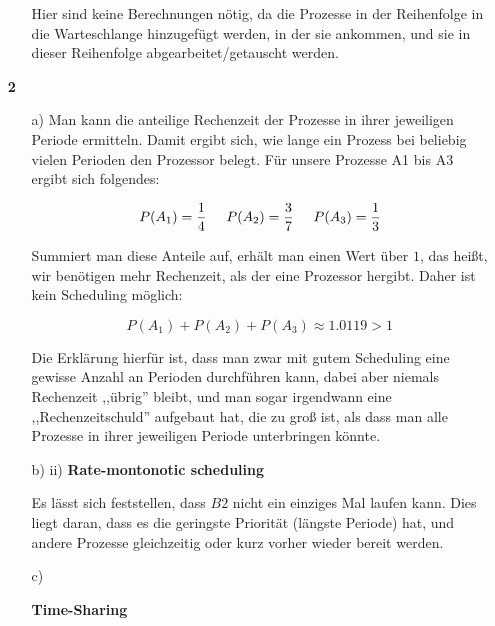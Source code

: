 \documentclass[a4paper,11pt]{article}
\begin{document}
\begin{enumerate}
\begin{itemize}
    Hier sind keine Berechnungen nötig, da die Prozesse in der Reihenfolge
    in die Warteschlange hinzugefügt werden, in der sie ankommen, und sie in
    dieser Reihenfolge abgearbeitet/getauscht werden.
\end{itemize}

\item[\textbf{2}]

\begin{itemize}
    \item[a)]
        Man kann die anteilige Rechenzeit der Prozesse in ihrer jeweiligen Periode
        ermitteln. Damit ergibt sich, wie lange ein Prozess bei beliebig vielen
        Perioden den Prozessor belegt. Für unsere Prozesse A1 bis A3 ergibt sich
        folgendes:

        $$P(A_1) = \frac{1}{4} \hspace{0.5cm} P(A_2) = \frac{3}{7} \hspace{0.5cm} P(A_3) = \frac{1}{3}$$

        Summiert man diese Anteile auf, erhält man einen Wert über $1$, das heißt,
        wir benötigen mehr Rechenzeit, als der eine Prozessor hergibt. Daher ist
        kein Scheduling möglich:

        $$P(A_1) + P(A_2) + P(A_3) \approx 1.0119 > 1$$

        Die Erklärung hierfür ist, dass man zwar mit gutem Scheduling eine gewisse
        Anzahl an Perioden durchführen kann, dabei aber niemals Rechenzeit ,,übrig''
        bleibt, und man sogar irgendwann eine ,,Rechenzeitschuld'' aufgebaut hat,
        die zu groß ist, als dass man alle Prozesse in ihrer jeweiligen Periode
        unterbringen könnte.

    \item[b) ii)]
        \textbf{Rate-montonotic scheduling}

        \begin{figure}[h]
            \center
            \scalebox{0.5}{}
        \end{figure}

        Es lässt sich feststellen, dass $B2$ nicht ein einziges Mal
        laufen kann. Dies liegt daran, dass es die geringste Priorität (längste
        Periode) hat, und andere Prozesse gleichzeitig oder kurz vorher wieder
        bereit werden.

    \item[c)]

        \textbf{Time-Sharing}


\end{itemize}
\end{enumerate}
\end{document}

